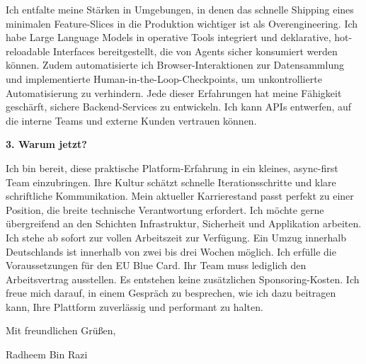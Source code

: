 \documentclass[11pt,a4paper]{coverletter}
\begin{document}
Ich entfalte meine Stärken in Umgebungen, in denen das schnelle Shipping eines minimalen Feature-Slices in die Produktion wichtiger ist als Overengineering. Ich habe Large Language Models in operative Tools integriert und deklarative, hot-reloadable Interfaces bereitgestellt, die von Agents sicher konsumiert werden können. Zudem automatisierte ich Browser-Interaktionen zur Datensammlung und implementierte Human-in-the-Loop-Checkpoints, um unkontrollierte Automatisierung zu verhindern. Jede dieser Erfahrungen hat meine Fähigkeit geschärft, sichere Backend-Services zu entwickeln. Ich kann APIs entwerfen, auf die interne Teams und externe Kunden vertrauen können.

\vspace{8pt}\noindent\textbf{3. Warum jetzt?}\par\vspace{3pt}

Ich bin bereit, diese praktische Platform-Erfahrung in ein kleines, async-first Team einzubringen. Ihre Kultur schätzt schnelle Iterationsschritte und klare schriftliche Kommunikation. Mein aktueller Karrierestand passt perfekt zu einer Position, die breite technische Verantwortung erfordert. Ich möchte gerne übergreifend an den Schichten Infrastruktur, Sicherheit und Applikation arbeiten. Ich stehe ab sofort zur vollen Arbeitszeit zur Verfügung. Ein Umzug innerhalb Deutschlands ist innerhalb von zwei bis drei Wochen möglich. Ich erfülle die Voraussetzungen für den EU Blue Card. Ihr Team muss lediglich den Arbeitsvertrag ausstellen. Es entstehen keine zusätzlichen Sponsoring-Kosten. Ich freue mich darauf, in einem Gespräch zu besprechen, wie ich dazu beitragen kann, Ihre Plattform zuverlässig und performant zu halten.

\closing{Mit freundlichen Grüßen,}{Radheem Bin Razi}
\end{document}

